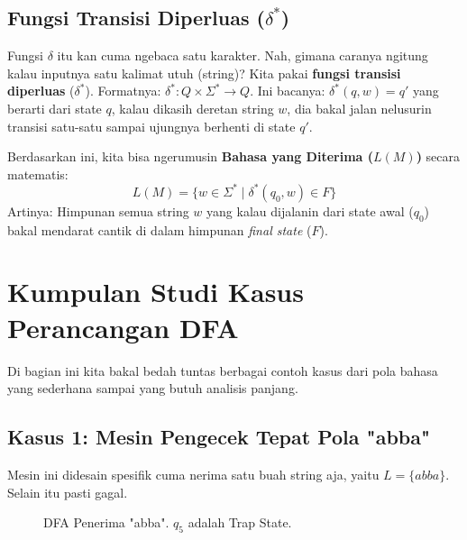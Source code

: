\documentclass[12pt,a4paper]{article}
\begin{document}
\subsection{Fungsi Transisi Diperluas ($\delta^*$)}
Fungsi $\delta$ itu kan cuma ngebaca satu karakter. Nah, gimana caranya ngitung kalau inputnya satu kalimat utuh (string)? Kita pakai \textbf{fungsi transisi diperluas} ($\delta^*$).
Formatnya: $\delta^* : Q \times \Sigma^* \rightarrow Q$.
Ini bacanya: $\delta^*(q, w) = q'$ yang berarti dari state $q$, kalau dikasih deretan string $w$, dia bakal jalan nelusurin transisi satu-satu sampai ujungnya berhenti di state $q'$.

Berdasarkan ini, kita bisa ngerumusin \textbf{Bahasa yang Diterima ($L(M)$)} secara matematis:
\[ L(M) = \{ w \in \Sigma^* \mid \delta^*(q_0, w) \in F \} \]
Artinya: Himpunan semua string $w$ yang kalau dijalanin dari state awal ($q_0$) bakal mendarat cantik di dalam himpunan \textit{final state} ($F$).

\newpage
\section{Kumpulan Studi Kasus Perancangan DFA}

Di bagian ini kita bakal bedah tuntas berbagai contoh kasus dari pola bahasa yang sederhana sampai yang butuh analisis panjang.

\subsection{Kasus 1: Mesin Pengecek Tepat Pola "abba"}
Mesin ini didesain spesifik cuma nerima satu buah string aja, yaitu $L = \{abba\}$. Selain itu pasti gagal.

\begin{figure}[h]
    \centering
    \caption{DFA Penerima "abba". $q_5$ adalah Trap State.}
\end{figure}
\end{document}
